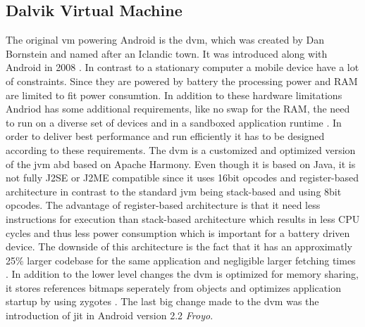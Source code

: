 \subsection{Dalvik Virtual Machine} \label{subsection:android-dalvik}
The original \gls{vm} powering Android is the \gls{dvm}, which was created by Dan Bornstein and named after an Iclandic town. It was introduced along with Android in 2008 \cite{developersRelease}.
\newline
In contrast to a stationary computer a mobile device have a lot of constraints.
Since they are powered by battery the processing power and RAM are limited to fit power consumtion.
In addition to these hardware limitations Andriod has some additional requirements, like no swap for the RAM, the need to run on a diverse set of devices and in a sandboxed application runtime .
In order to deliver best performance and run efficiently it has to be designed according to these requirements.
The \gls{dvm} is a customized and optimized version of the \gls{jvm} abd based on Apache Harmony.
Even though it is based on Java, it is not fully J2SE or J2ME compatible since it uses 16bit opcodes and register-based architecture in contrast to the standard \gls{jvm} being stack-based and using 8bit opcodes.
The advantage of register-based architecture is that it need less instructions for execution than stack-based architecture which results in less CPU cycles and thus less power consumption which is important for a battery driven device.
The downside of this architecture is the fact that it has an approximatly 25\% larger codebase for the same application and negligible larger fetching times \cite{ehringerDalvik}.
In addition to the lower level changes the \gls{dvm} is optimized for memory sharing, it stores references bitmaps seperately from objects and optimizes application startup by using zygotes \cite{andevconDalvikART}.
\newline
The last big change made to the \gls{dvm} was the introduction of \gls{jit} in Android version 2.2 \textit{Froyo}.
